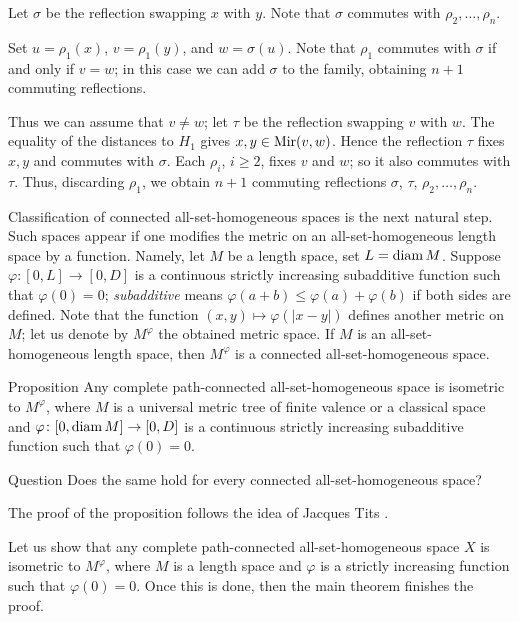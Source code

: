 \documentclass[a4paper,10pt]{article}
\begin{document}
Let $\sigma$ be the reflection swapping $x$ with $y$.
Note that $\sigma$ commutes with $\rho_2,\ldots,\rho_n$.

Set $u=\rho_1(x)$, $v=\rho_1(y)$, and $w=\sigma(u)$.
Note that $\rho_1$ commutes with $\sigma$ if and only if $v=w$;
in this case we can add $\sigma$ to the family, obtaining $n+1$ commuting reflections.

Thus we can assume that $v\ne w$; let $\tau$ be the reflection swapping $v$ with $w$.
The equality of the distances to $H_1$ gives $x,y\in\mathrm{Mir}(v,w)$.
Hence the reflection $\tau$ fixes $x,y$ and commutes with $\sigma$.
Each $\rho_i$, $i\geqslant2$, fixes $v$ and $w$; so it also commutes with $\tau$.
Thus, discarding $\rho_1$, we obtain $n+1$ commuting reflections
$\sigma$, $\tau$, $\rho_2,\ldots,\rho_n$.
\qeds


Classification of connected all-set-homogeneous spaces is the next natural step.
Such spaces appear if one modifies the metric on an all-set-homogeneous length space by a function.
Namely, let $M$ be a length space, set $L=\mathop{\rm diam}\nolimits M$.
Suppose $\varphi\colon[0,L]\to[0,D]$ is a continuous strictly increasing subadditive function such that $\varphi(0)=0$; \emph{subadditive} means $\varphi(a+b)\leqslant \varphi(a)+\varphi(b)$ if both sides are defined.
Note that the function $(x,y)\mapsto \varphi(|x-y|)$ defines another metric on $M$;
let us denote by $M^\varphi$ the obtained metric space.
If $M$ is an all-set-homogeneous length space, then $M^\varphi$ is a connected all-set-homogeneous space.

\begin{thm}{Proposition}\label{prop:path-connected}
Any complete path-connected all-set-homogeneous space is isometric to $M^\varphi$, where $M$ is a universal metric tree of finite valence or a classical space and $\varphi\colon[0,\mathop{\rm diam}\nolimits M]\to [0,D]$ is a continuous strictly increasing subadditive function such that $\varphi(0)=0$.
\end{thm}

\begin{thm}{Question}
Does the same hold for every connected all-set-homogeneous space?
\end{thm}

The proof of the proposition follows the idea of Jacques Tits \cite[IV.E § 3]{tits}.

Let us show that any complete path-connected all-set-homogeneous space $X$ is isometric to $M^\varphi$, where $M$ is a length space and $\varphi$ is a strictly increasing function such that $\varphi(0)=0$.
Once this is done, then the main theorem finishes the proof.
\end{document}
